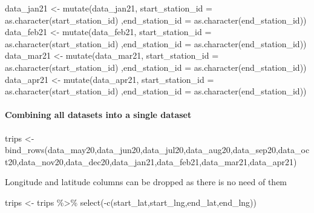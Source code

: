 \documentclass[
]{article}
\newenvironment{Shaded}{\begin{snugshade}}{\end{snugshade}}
\newcommand{\AttributeTok}[1]{\textcolor[rgb]{0.77,0.63,0.00}{#1}}
\newcommand{\FunctionTok}[1]{\textcolor[rgb]{0.00,0.00,0.00}{#1}}
\newcommand{\NormalTok}[1]{#1}
\newcommand{\OtherTok}[1]{\textcolor[rgb]{0.56,0.35,0.01}{#1}}
\newcommand{\SpecialCharTok}[1]{\textcolor[rgb]{0.00,0.00,0.00}{#1}}
\begin{document}
\begin{Shaded}
\begin{Highlighting}[]
\NormalTok{data\_jan21 }\OtherTok{\textless{}{-}}  \FunctionTok{mutate}\NormalTok{(data\_jan21, }\AttributeTok{start\_station\_id =} \FunctionTok{as.character}\NormalTok{(start\_station\_id)}
\NormalTok{                      ,}\AttributeTok{end\_station\_id =} \FunctionTok{as.character}\NormalTok{(end\_station\_id))}
\NormalTok{data\_feb21 }\OtherTok{\textless{}{-}}  \FunctionTok{mutate}\NormalTok{(data\_feb21, }\AttributeTok{start\_station\_id =} \FunctionTok{as.character}\NormalTok{(start\_station\_id)}
\NormalTok{                      ,}\AttributeTok{end\_station\_id =} \FunctionTok{as.character}\NormalTok{(end\_station\_id)) }
\NormalTok{data\_mar21 }\OtherTok{\textless{}{-}}  \FunctionTok{mutate}\NormalTok{(data\_mar21, }\AttributeTok{start\_station\_id =} \FunctionTok{as.character}\NormalTok{(start\_station\_id)}
\NormalTok{                      ,}\AttributeTok{end\_station\_id =} \FunctionTok{as.character}\NormalTok{(end\_station\_id)) }
\NormalTok{data\_apr21 }\OtherTok{\textless{}{-}}  \FunctionTok{mutate}\NormalTok{(data\_apr21, }\AttributeTok{start\_station\_id =} \FunctionTok{as.character}\NormalTok{(start\_station\_id)}
\NormalTok{                      ,}\AttributeTok{end\_station\_id =} \FunctionTok{as.character}\NormalTok{(end\_station\_id))}
\end{Highlighting}
\end{Shaded}

\hypertarget{combining-all-datasets-into-a-single-dataset}{%
\paragraph{Combining all datasets into a single
dataset}\label{combining-all-datasets-into-a-single-dataset}}

\begin{Shaded}
\begin{Highlighting}[]
\NormalTok{trips }\OtherTok{\textless{}{-}} \FunctionTok{bind\_rows}\NormalTok{(data\_may20,data\_jun20,data\_jul20,data\_aug20,data\_sep20,data\_oct20,data\_nov20,data\_dec20,data\_jan21,data\_feb21,data\_mar21,data\_apr21)}
\end{Highlighting}
\end{Shaded}

Longitude and latitude columns can be dropped as there is no need of
them

\begin{Shaded}
\begin{Highlighting}[]
\NormalTok{trips }\OtherTok{\textless{}{-}}\NormalTok{ trips }\SpecialCharTok{\%\textgreater{}\%}
  \FunctionTok{select}\NormalTok{(}\SpecialCharTok{{-}}\FunctionTok{c}\NormalTok{(start\_lat,start\_lng,end\_lat,end\_lng))}
\end{Highlighting}
\end{Shaded}
\end{document}
